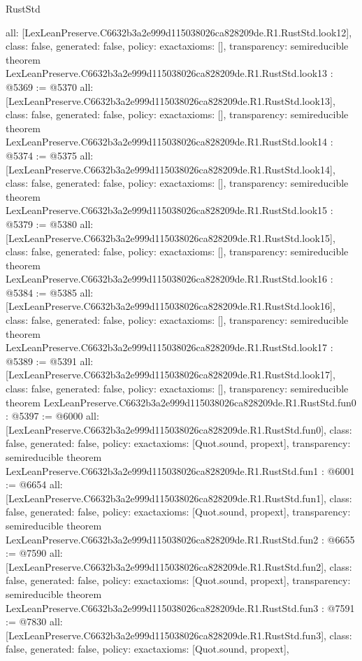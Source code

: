 \begin{lexlean}{RustStd}
\begin{coremodule}
{  all: [LexLeanPreserve.C6632b3a2e999d115038026ca828209de.R1.RustStd.look12],
  class: false,
  generated: false,
  policy: exact{axioms: []},
  transparency: semireducible
}
theorem LexLeanPreserve.C6632b3a2e999d115038026ca828209de.R1.RustStd.look13 : @5369 := @5370 {
  all: [LexLeanPreserve.C6632b3a2e999d115038026ca828209de.R1.RustStd.look13],
  class: false,
  generated: false,
  policy: exact{axioms: []},
  transparency: semireducible
}
theorem LexLeanPreserve.C6632b3a2e999d115038026ca828209de.R1.RustStd.look14 : @5374 := @5375 {
  all: [LexLeanPreserve.C6632b3a2e999d115038026ca828209de.R1.RustStd.look14],
  class: false,
  generated: false,
  policy: exact{axioms: []},
  transparency: semireducible
}
theorem LexLeanPreserve.C6632b3a2e999d115038026ca828209de.R1.RustStd.look15 : @5379 := @5380 {
  all: [LexLeanPreserve.C6632b3a2e999d115038026ca828209de.R1.RustStd.look15],
  class: false,
  generated: false,
  policy: exact{axioms: []},
  transparency: semireducible
}
theorem LexLeanPreserve.C6632b3a2e999d115038026ca828209de.R1.RustStd.look16 : @5384 := @5385 {
  all: [LexLeanPreserve.C6632b3a2e999d115038026ca828209de.R1.RustStd.look16],
  class: false,
  generated: false,
  policy: exact{axioms: []},
  transparency: semireducible
}
theorem LexLeanPreserve.C6632b3a2e999d115038026ca828209de.R1.RustStd.look17 : @5389 := @5391 {
  all: [LexLeanPreserve.C6632b3a2e999d115038026ca828209de.R1.RustStd.look17],
  class: false,
  generated: false,
  policy: exact{axioms: []},
  transparency: semireducible
}
theorem LexLeanPreserve.C6632b3a2e999d115038026ca828209de.R1.RustStd.fun0 : @5397 := @6000 {
  all: [LexLeanPreserve.C6632b3a2e999d115038026ca828209de.R1.RustStd.fun0],
  class: false,
  generated: false,
  policy: exact{axioms: [Quot.sound, propext]},
  transparency: semireducible
}
theorem LexLeanPreserve.C6632b3a2e999d115038026ca828209de.R1.RustStd.fun1 : @6001 := @6654 {
  all: [LexLeanPreserve.C6632b3a2e999d115038026ca828209de.R1.RustStd.fun1],
  class: false,
  generated: false,
  policy: exact{axioms: [Quot.sound, propext]},
  transparency: semireducible
}
theorem LexLeanPreserve.C6632b3a2e999d115038026ca828209de.R1.RustStd.fun2 : @6655 := @7590 {
  all: [LexLeanPreserve.C6632b3a2e999d115038026ca828209de.R1.RustStd.fun2],
  class: false,
  generated: false,
  policy: exact{axioms: [Quot.sound, propext]},
  transparency: semireducible
}
theorem LexLeanPreserve.C6632b3a2e999d115038026ca828209de.R1.RustStd.fun3 : @7591 := @7830 {
  all: [LexLeanPreserve.C6632b3a2e999d115038026ca828209de.R1.RustStd.fun3],
  class: false,
  generated: false,
  policy: exact{axioms: [Quot.sound, propext]},
}
\end{coremodule}
\end{lexlean}
